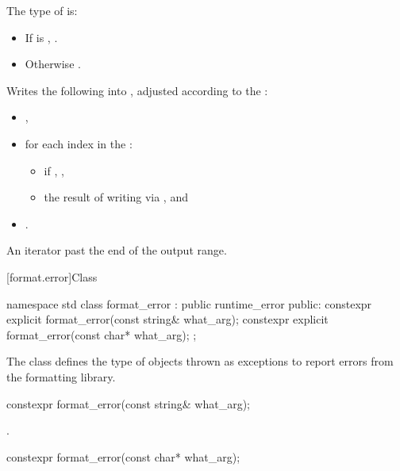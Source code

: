 \begin{itemdescr}
\pnum
The type of  is:
\begin{itemize}
\item
If  is ,
.
\item
Otherwise .
\end{itemize}

\pnum
\effects
Writes the following into ,
adjusted according to the :
\begin{itemize}
\item
{},
\item
for each index  in the :
\begin{itemize}
\item
if , ,
\item
the result of writing 
via , and
\end{itemize}
\item
{}.
\end{itemize}

\pnum
\returns
An iterator past the end of the output range.
\end{itemdescr}

[format.error]{Class }

%
\begin{codeblock}
namespace std {
  class format_error : public runtime_error {
  public:
    constexpr explicit format_error(const string& what_arg);
    constexpr explicit format_error(const char* what_arg);
  };
}
\end{codeblock}

\pnum
The class  defines the type of objects thrown as
exceptions to report errors from the formatting library.

%
\begin{itemdecl}
constexpr format_error(const string& what_arg);
\end{itemdecl}

\begin{itemdescr}
\pnum
\ensures
{}.

%
\end{itemdescr}
\begin{itemdecl}
constexpr format_error(const char* what_arg);
\end{itemdecl}

